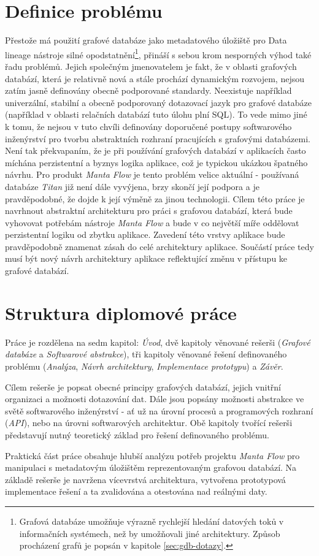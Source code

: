\section{Definice problému}
Přestože má použití grafové databáze jako metadatového úložiště pro Data lineage nástroje silné opodstatnění\footnote{Grafová databáze umožňuje výrazně rychlejší hledání datových toků v informačních systémech, než by umožňovali jiné architektury. Způsob procházení grafů je popsán v kapitole \ref{sec:gdb-dotazy}.}, přináší s sebou krom nesporných výhod také řadu problémů. Jejich společným jmenovatelem je fakt, že v oblasti grafových databází, která je relativně nová a stále prochází dynamickým rozvojem, nejsou zatím jasně definovány obecně podporované standardy. Neexistuje například univerzální, stabilní a obecně podporovaný dotazovací jazyk pro grafové databáze (například v oblasti relačních databází tuto úlohu plní SQL). To vede mimo jiné k tomu, že nejsou v tuto chvíli definovány doporučené postupy softwarového inženýrství pro tvorbu abstraktních rozhraní pracujících s grafovými databázemi. Není tak překvapaním, že je při používání grafových databází v aplikacích často míchána perzistentní a byznys logika aplikace, což je typickou ukázkou špatného návrhu\cite{Taylor09}. Pro produkt \textit{Manta Flow} je tento problém velice aktuální - používaná databáze \textit{Titan} již není dále vyvýjena, brzy skončí její podpora \cite{Titan04} a je pravděpodobné, že dojde k její výměně za jinou technologii. Cílem této práce je navrhnout abstraktní architekturu pro práci s grafovou databází, která bude vyhovovat potřebám nástroje \textit{Manta Flow} a bude v co největší míře oddělovat perzistentní logiku od zbytku aplikace. Zavedení této vrstvy aplikace bude pravděpodobně znamenat zásah do celé architektury aplikace. Součástí práce tedy musí být nový návrh architektury aplikace reflektující změnu v přístupu ke grafové databází.

\section{Struktura diplomové práce}
Práce je rozdělena na sedm kapitol: \textit{Úvod}, dvě kapitoly věnované rešerši (\textit{Grafové databáze} a \textit{Softwarové abstrakce}), tři kapitoly věnované řešení definovaného problému (\textit{Analýza}, \textit{Návrh architektury}, \textit{Implementace prototypu}) a \textit{Závěr}.

Cílem rešerše je popsat obecné principy grafových databází, jejich vnitřní organizaci a možnosti dotazování dat. Dále jsou popsány možnosti abstrakce ve světě softwarového inženýrství - ať už na úrovní procesů a programových rozhraní (\textit{API}), nebo na úrovni softwarových architektur. Obě kapitoly tvořící rešerši představují nutný teoretický základ pro řešení definovaného problému.

Praktická část práce obsahuje hlubší analýzu potřeb projektu \textit{Manta Flow} pro manipulaci s metadatovým úložištěm reprezentovaným grafovou databází. Na základě rešerše je navržena vícevrstvá architektura, vytvořena prototypová implementace řešení a ta zvalidována a otestována nad reálnými daty.
